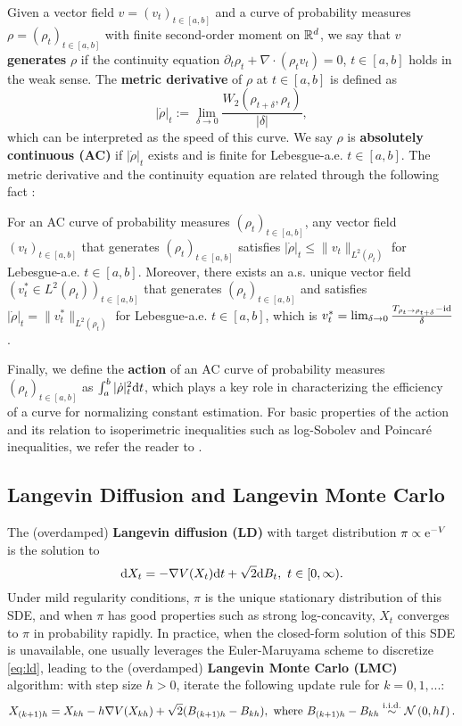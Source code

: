 Given a vector field $v=(v_t)_{t\in[a,b]}$ and a curve of probability measures $\rho=(\rho_t)_{t\in[a,b]}$ with finite second-order moment on $\mathbb{R}^d$, we say that $v$ \textbf{generates} $\rho$ if the continuity equation $\partial_t\rho_t+\nabla\cdot(\rho_tv_t)=0$, $t\in[a,b]$ holds in the weak sense. The \textbf{metric derivative} of $\rho$ at $t\in[a,b]$ is defined as
$$|\dot\rho|_t:=\lim_{\delta\to0}\frac{W_2(\rho_{t+\delta},\rho_t)}{|\delta|},$$
which can be interpreted as the speed of this curve. We say $\rho$ is \textbf{absolutely continuous (AC)} if $|\dot\rho|_t$ exists and is finite for Lebesgue-a.e. $t\in[a,b]$. The metric derivative and the continuity equation are related through the following fact \citep[Thm. 8.3.1 \& Prop. 8.4.5]{ambrosio2008gradient}:
\begin{lemma}
    For an AC curve of probability measures $(\rho_t)_{t\in[a,b]}$, any vector field $(v_t)_{t\in[a,b]}$ that generates $(\rho_t)_{t\in[a,b]}$ satisfies $|\dot\rho|_t\le\|v_t\|_{L^2(\rho_t)}$ for Lebesgue-a.e. $t\in[a,b]$. Moreover, there exists an a.s. unique vector field $(v^*_t\in L^2(\rho_t))_{t\in[a,b]}$ that generates $(\rho_t)_{t\in[a,b]}$ and satisfies $|\dot\rho|_t=\|v^*_t\|_{L^2(\rho_t)}$ for Lebesgue-a.e. $t\in[a,b]$, which is $v^*_t=\lim_{\delta\to0}\frac{T_{\rho_t\to\rho_{t+\delta}}-\operatorname{id}}{\delta}$.
    \label{lem:metric}
\end{lemma}

Finally, we define the \textbf{action} of an AC curve of probability measures $(\rho_t)_{t\in[a,b]}$ as $\int_a^b|\dot\rho|_t^2\mathrm{d} t$, which plays a key role in characterizing the efficiency of a curve for normalizing constant estimation. For basic properties of the action and its relation to isoperimetric inequalities such as log-Sobolev and Poincar\'e inequalities, we refer the reader to \citet[Lem. 3 \& Ex. 1]{guo2025provable}.

\subsection{Langevin Diffusion and Langevin Monte Carlo}
The (overdamped) \textbf{Langevin diffusion (LD)} with target distribution $\pi\propto\mathrm{e}^{-V}$ is the solution to
\begin{equation}
    \mathrm{d} X_t=-\nabla V(X_t)\mathrm{d} t+\sqrt{2}\mathrm{d} B_t,~t\in[0,\infty).
    \label{eq:ld}
\end{equation}
Under mild regularity conditions, $\pi$ is the unique stationary distribution of this SDE, and when $\pi$ has good properties such as strong log-concavity, $X_t$ converges to $\pi$ in probability rapidly. In practice, when the closed-form solution of this SDE is unavailable, one usually leverages the Euler-Maruyama scheme to discretize \cref{eq:ld}, leading to the (overdamped) \textbf{Langevin Monte Carlo (LMC)} algorithm: with step size $h>0$, iterate the following update rule for $k=0,1,...$:
\begin{equation}
    X_{(k+1)h}=X_{kh}-h\nabla V(X_{kh})+\sqrt{2}(B_{(k+1)h}-B_{kh}),~\text{where}~B_{(k+1)h}-B_{kh}\stackrel{\mathrm{i.i.d.}}{\sim}\operatorname{\mathcal{N}}\left(0,hI\right).
    \label{eq:lmc_disc}
\end{equation}

